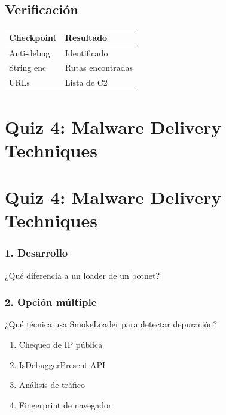 \documentclass[
  letterpaper,
]{report}
\newcounter{none} %
\providecommand{\tightlist}{%
  \setlength{\itemsep}{0pt}\setlength{\parskip}{0pt}}
\begin{document}
\section{Verificación}\label{verificaciuxf3n-2}

{\def\LTcaptype{none} %
\begin{longtable}[]{@{}ll@{}}
\toprule\noalign{}
Checkpoint & Resultado \\
\midrule\noalign{}
\endhead
\bottomrule\noalign{}
\endlastfoot
Anti-debug & Identificado \\
String enc & Rutas encontradas \\
URLs & Lista de C2 \\
\end{longtable}
}

\chapter{Quiz 4: Malware Delivery
Techniques}\label{quiz-4-malware-delivery-techniques}

\chapter{Quiz 4: Malware Delivery
Techniques}\label{quiz-4-malware-delivery-techniques-1}

\subsection{1. Desarrollo}\label{desarrollo-2}

¿Qué diferencia a un loader de un botnet?

\subsection{2. Opción múltiple}\label{opciuxf3n-muxfaltiple-2}

¿Qué técnica usa SmokeLoader para detectar depuración?

\begin{enumerate}
\def\labelenumi{\alph{enumi})}
\tightlist
\item
  Chequeo de IP pública\\
\item
  IsDebuggerPresent API\\
\item
  Análisis de tráfico\\
\item
  Fingerprint de navegador
\end{enumerate}
\end{document}
